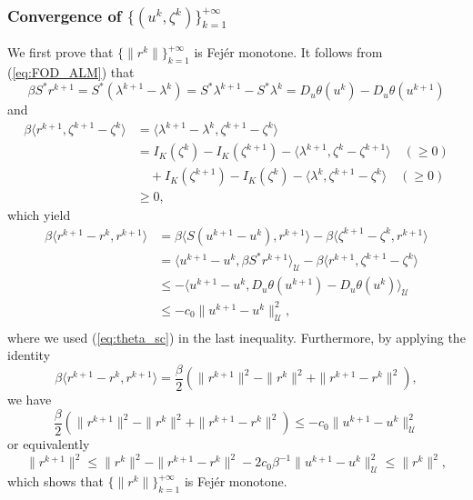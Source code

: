 \documentclass[leqno]{amsart}
\theoremstyle{definition}
\begin{document}
\subsubsection{Convergence of $\{(u^k, \zeta^k)\}_{k=1}^{+\infty}$} We first prove that $\{\|r^{k}\|\}_{k=1}^{+\infty}$ is  Fej\'{e}r monotone. 
It follows from (\ref{eq:FOD_ALM}) that
\begin{equation}\nonumber
\beta S^*r^{k+1} 
= S^*( \lambda^{k+1} - \lambda^k)
= S^* \lambda^{k+1} - S^* \lambda^k
= D_u\theta(u^{k}) - D_u\theta(u^{k+1})
\end{equation}
and
\begin{equation}\nonumber
\begin{aligned}
\beta\langle r^{k+1}, \zeta^{k+1} - \zeta^k\rangle
 & = \langle \lambda^{k+1} - \lambda^k, \zeta^{k+1} - \zeta^k \rangle\\
 & = I_K(\zeta^k) - I_K(\zeta^{k+1}) - \langle\lambda^{k+1} ,\zeta^k - \zeta^{k+1}\rangle\quad (\geq 0)\\
 &\quad + I_K(\zeta^{k+1}) - I_K(\zeta^{k}) - \langle\lambda^{k} ,\zeta^{k+1} - \zeta^{k}\rangle\quad (\geq 0)\\
 &\geq 0,
\end{aligned}
\end{equation}
which yield
\begin{equation}\nonumber
\begin{aligned}
\beta\langle r^{k+1} - r^{k}, r^{k+1}\rangle
& = \beta\langle S(u^{k+1} - u^{k}), r^{k+1} \rangle - \beta\langle \zeta^{k+1} - \zeta^{k}, r^{k+1} \rangle\\
& = \langle u^{k+1} - u^{k}, \beta S^*r^{k+1} \rangle_\mathcal{U} - \beta\langle r^{k+1}, \zeta^{k+1} - \zeta^{k} \rangle\\
& \leq -\langle u^{k+1} - u^{k}, D_u\theta(u^{k+1}) - D_u\theta(u^{k}) \rangle_\mathcal{U} \\
& \leq - c_0\|u^{k+1} - u^{k}\|^2_{\mathcal{U}},\\
\end{aligned}
\end{equation}
where we used (\ref{eq:theta_sc}) in the last inequality. Furthermore, by applying the identity
$$ \beta\langle r^{k+1} - r^{k}, r^{k+1}\rangle = \frac{\beta}{2}\left(\|r^{k+1}\|^2 -\|r^{k}\|^2 + \|r^{k+1} - r^k\|^2\right),$$
we have
$$ \frac{\beta}{2}\left(\|r^{k+1}\|^2 -\|r^{k}\|^2 + \|r^{k+1} - r^k\|^2\right) \leq - c_0\|u^{k+1} - u^{k}\|^2_{\mathcal{U}}$$
or equivalently
\begin{equation}\label{eq:Fejer_m}
\|r^{k+1}\|^2 \leq  \|r^{k}\|^2 - \|r^{k+1} - r^k\|^2 - 2c_0\beta^{-1}\|u^{k+1} - u^{k}\|^2_{\mathcal{U}}\leq \|r^{k}\|^2,
\end{equation}
which shows that $\{\|r^{k}\|\}_{k=1}^{+\infty}$ is Fej\'{e}r monotone.
\end{document}
